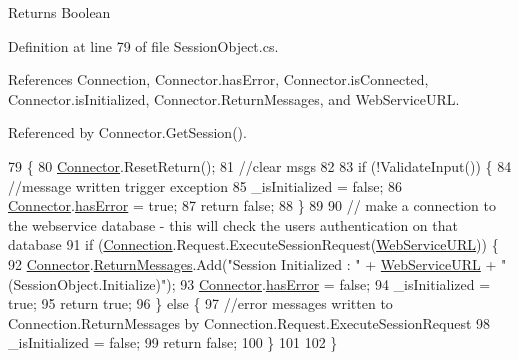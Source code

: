 \begin{DoxyReturn}{Returns}
Boolean
\end{DoxyReturn}


Definition at line 79 of file Session\+Object.\+cs.



References Connection, Connector.\+has\+Error, Connector.\+is\+Connected, Connector.\+is\+Initialized, Connector.\+Return\+Messages, and Web\+Service\+U\+RL.



Referenced by Connector.\+Get\+Session().


\begin{DoxyCode}
79                              \{
80         \hyperlink{class_connector}{Connector}.ResetReturn();
81         \textcolor{comment}{//clear msgs}
82 
83         \textcolor{keywordflow}{if} (!ValidateInput()) \{
84             \textcolor{comment}{//message written trigger exception}
85             \_isInitialized = \textcolor{keyword}{false};
86             \hyperlink{class_connector}{Connector}.\hyperlink{class_connector_a079bae21a5417efa53bfe8954c0f533f}{hasError} = \textcolor{keyword}{true};
87             \textcolor{keywordflow}{return} \textcolor{keyword}{false};
88         \}
89 
90         \textcolor{comment}{// make a connection to the webservice database - this will check the users authentication on that
       database}
91         \textcolor{keywordflow}{if} (\hyperlink{class_session_object_a014bdbf705a753540e19bfb53030c55c}{Connection}.Request.ExecuteSessionRequest(\hyperlink{class_session_object_a697c071c812fbf7ad1166b896fb44c16}{WebServiceURL})) \{
92             \hyperlink{class_connector}{Connector}.\hyperlink{class_connector_a1ed422674b344524fd77998dcf6a9ba6}{ReturnMessages}.Add(\textcolor{stringliteral}{"Session Initialized : "} + 
      \hyperlink{class_session_object_a697c071c812fbf7ad1166b896fb44c16}{WebServiceURL} + \textcolor{stringliteral}{" (SessionObject.Initialize)"});
93             \hyperlink{class_connector}{Connector}.\hyperlink{class_connector_a079bae21a5417efa53bfe8954c0f533f}{hasError} = \textcolor{keyword}{false};
94             \_isInitialized = \textcolor{keyword}{true};
95             \textcolor{keywordflow}{return} \textcolor{keyword}{true};
96         \} \textcolor{keywordflow}{else} \{
97             \textcolor{comment}{//error messages written to Connection.ReturnMessages by
       Connection.Request.ExecuteSessionRequest}
98             \_isInitialized = \textcolor{keyword}{false};
99             \textcolor{keywordflow}{return} \textcolor{keyword}{false};
100         \}
101 
102     \}
\end{DoxyCode}


